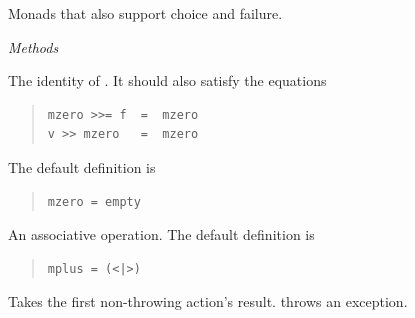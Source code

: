 \begin{haddockdesc}
\item[\begin{tabular}{@{}l}
class (Alternative m, Monad m) => MonadPlus m where
\end{tabular}]
{\haddockbegindoc
Monads that also support choice and failure.\par
\haddockpremethods{}\emph{Methods}
\begin{haddockdesc}
\item[\begin{tabular}{@{}l}
mzero :: m a
\end{tabular}]
{\haddockbegindoc
The identity of .  It should also satisfy the equations\par
\begin{quote}
{\haddockverb\begin{verbatim}
mzero >>= f  =  mzero
v >> mzero   =  mzero\end{verbatim}}
\end{quote}
The default definition is\par
\begin{quote}
{\haddockverb\begin{verbatim}
mzero = empty
\end{verbatim}}
\end{quote}}
\end{haddockdesc}
\begin{haddockdesc}
\item[\begin{tabular}{@{}l}
mplus :: m a -> m a -> m a
\end{tabular}]
{\haddockbegindoc
An associative operation. The default definition is\par
\begin{quote}
{\haddockverb\begin{verbatim}
mplus = (<|>)
\end{verbatim}}
\end{quote}}
\end{haddockdesc}}
\end{haddockdesc}
\begin{haddockdesc}
\item[\begin{tabular}{@{}l}
\end{tabular}]
\end{haddockdesc}
\begin{haddockdesc}
\item[\begin{tabular}{@{}l}
instance MonadPlus IO
\end{tabular}]
{\haddockbegindoc
Takes the first non-throwing  action's result.
  throws an exception.\par}
\end{haddockdesc}
